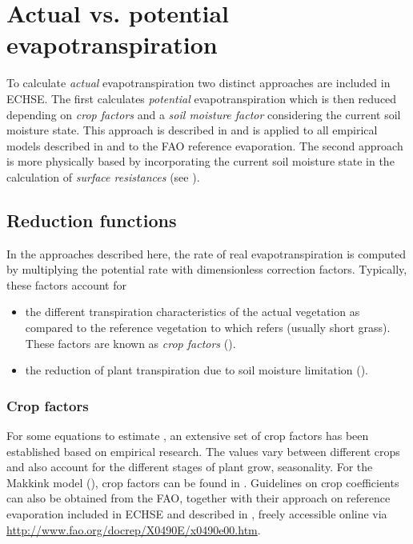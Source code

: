 \section{Actual vs. potential evapotranspiration} \label{sec:et:act}
To calculate \emph{actual} evapotranspiration two distinct approaches are included in ECHSE. The first calculates \emph{potential} evapotranspiration which is then reduced depending on \emph{crop factors} and a \emph{soil moisture factor} considering the current soil moisture state. This approach is described in  and is applied to all empirical models described in  and to the FAO reference evaporation. The second approach is more physically based by incorporating the current soil moisture state in the calculation of \emph{surface resistances} (see ).


\subsection{Reduction functions} \label{sec:eta:redfunc}

In the approaches described here, the rate of real evapotranspiration \etReal{} is computed by multiplying the potential rate \etPot{} with dimensionless correction factors. Typically, these factors account for
\begin{itemize}
  \item the different transpiration characteristics of the actual vegetation as compared to the reference vegetation to which \etPot{} refers (usually short grass). These factors are known as \emph{crop factors} ().
  \item the reduction of plant transpiration due to soil moisture limitation ().
\end{itemize}

\subsubsection{Crop factors} \label{sec:eta:cropfactors}

For some equations to estimate \etPot{}, an extensive set of crop factors has been established based on empirical research. The values vary between different crops and also account for the different stages of plant grow, \ie{} seasonality. For the Makkink model (), crop factors can be found in \citet{Feddes1987}. Guidelines on crop coefficients can also be obtained from the FAO, together with their approach on reference evaporation included in ECHSE and described in , freely accessible online via \url{http://www.fao.org/docrep/X0490E/x0490e00.htm}.

